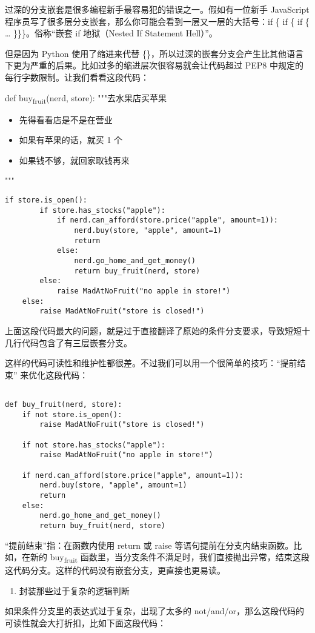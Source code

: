 \documentclass[11pt]{article}
\begin{document}
过深的分支嵌套是很多编程新手最容易犯的错误之一。假如有一位新手 JavaScript 程序员写了很多层分支嵌套，那么你可能会看到一层又一层的大括号：if \{ if \{ if \{ \ldots{} \}\}\}。俗称“嵌套 if 地狱（Nested If Statement Hell）”。

但是因为 Python 使用了缩进来代替 \{\}，所以过深的嵌套分支会产生比其他语言下更为严重的后果。比如过多的缩进层次很容易就会让代码超过 PEP8 中规定的每行字数限制。让我们看看这段代码：

def buy\textsubscript{fruit}(nerd, store):
    """去水果店买苹果

\begin{itemize}
\item 先得看看店是不是在营业
\item 如果有苹果的话，就买 1 个
\item 如果钱不够，就回家取钱再来
\end{itemize}
"""
\begin{verbatim}
if store.is_open():
        if store.has_stocks("apple"):
            if nerd.can_afford(store.price("apple", amount=1)):
                nerd.buy(store, "apple", amount=1)
                return
            else:
                nerd.go_home_and_get_money()
                return buy_fruit(nerd, store)
        else:
            raise MadAtNoFruit("no apple in store!")
    else:
        raise MadAtNoFruit("store is closed!")
\end{verbatim}
上面这段代码最大的问题，就是过于直接翻译了原始的条件分支要求，导致短短十几行代码包含了有三层嵌套分支。

这样的代码可读性和维护性都很差。不过我们可以用一个很简单的技巧：“提前结束” 来优化这段代码：
\begin{verbatim}

def buy_fruit(nerd, store):
    if not store.is_open():
        raise MadAtNoFruit("store is closed!")

    if not store.has_stocks("apple"):
        raise MadAtNoFruit("no apple in store!")

    if nerd.can_afford(store.price("apple", amount=1)):
        nerd.buy(store, "apple", amount=1)
        return
    else:
        nerd.go_home_and_get_money()
        return buy_fruit(nerd, store)
\end{verbatim}
“提前结束”指：在函数内使用 return 或 raise 等语句提前在分支内结束函数。比如，在新的 buy\textsubscript{fruit} 函数里，当分支条件不满足时，我们直接抛出异常，结束这段这代码分支。这样的代码没有嵌套分支，更直接也更易读。

\begin{enumerate}
\item 封装那些过于复杂的逻辑判断
\end{enumerate}
如果条件分支里的表达式过于复杂，出现了太多的 not/and/or，那么这段代码的可读性就会大打折扣，比如下面这段代码：
\end{document}
